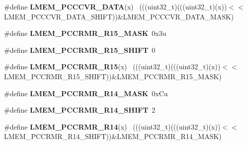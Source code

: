 \begin{DoxyCompactItemize}
\item 
\hypertarget{group___l_m_e_m___register___masks_ga3b95b7a350d6a043b441c90a8bc576f1}{}\#define {\bfseries L\+M\+E\+M\+\_\+\+P\+C\+C\+C\+V\+R\+\_\+\+D\+A\+T\+A}(x)                                        ~(((uint32\+\_\+t)(((uint32\+\_\+t)(x))$<$$<$L\+M\+E\+M\+\_\+\+P\+C\+C\+C\+V\+R\+\_\+\+D\+A\+T\+A\+\_\+\+S\+H\+I\+F\+T))\&L\+M\+E\+M\+\_\+\+P\+C\+C\+C\+V\+R\+\_\+\+D\+A\+T\+A\+\_\+\+M\+A\+S\+K)\label{group___l_m_e_m___register___masks_ga3b95b7a350d6a043b441c90a8bc576f1}

\item 
\hypertarget{group___l_m_e_m___register___masks_ga14b70993734b4be51109e03aa1fa5bfe}{}\#define {\bfseries L\+M\+E\+M\+\_\+\+P\+C\+C\+R\+M\+R\+\_\+\+R15\+\_\+\+M\+A\+S\+K}~0x3u\label{group___l_m_e_m___register___masks_ga14b70993734b4be51109e03aa1fa5bfe}

\item 
\hypertarget{group___l_m_e_m___register___masks_ga2efe89fa452d381b7dd8783936079395}{}\#define {\bfseries L\+M\+E\+M\+\_\+\+P\+C\+C\+R\+M\+R\+\_\+\+R15\+\_\+\+S\+H\+I\+F\+T}~0\label{group___l_m_e_m___register___masks_ga2efe89fa452d381b7dd8783936079395}

\item 
\hypertarget{group___l_m_e_m___register___masks_ga40511d68fe2c77abc65093b9e5037b16}{}\#define {\bfseries L\+M\+E\+M\+\_\+\+P\+C\+C\+R\+M\+R\+\_\+\+R15}(x)                                          ~(((uint32\+\_\+t)(((uint32\+\_\+t)(x))$<$$<$L\+M\+E\+M\+\_\+\+P\+C\+C\+R\+M\+R\+\_\+\+R15\+\_\+\+S\+H\+I\+F\+T))\&L\+M\+E\+M\+\_\+\+P\+C\+C\+R\+M\+R\+\_\+\+R15\+\_\+\+M\+A\+S\+K)\label{group___l_m_e_m___register___masks_ga40511d68fe2c77abc65093b9e5037b16}

\item 
\hypertarget{group___l_m_e_m___register___masks_gab9ecd999d1105864b21f9f35a186d802}{}\#define {\bfseries L\+M\+E\+M\+\_\+\+P\+C\+C\+R\+M\+R\+\_\+\+R14\+\_\+\+M\+A\+S\+K}~0x\+Cu\label{group___l_m_e_m___register___masks_gab9ecd999d1105864b21f9f35a186d802}

\item 
\hypertarget{group___l_m_e_m___register___masks_gaedbf94a5cbc142f720dba20256850ea4}{}\#define {\bfseries L\+M\+E\+M\+\_\+\+P\+C\+C\+R\+M\+R\+\_\+\+R14\+\_\+\+S\+H\+I\+F\+T}~2\label{group___l_m_e_m___register___masks_gaedbf94a5cbc142f720dba20256850ea4}

\item 
\hypertarget{group___l_m_e_m___register___masks_gab0ba92199205e8ab20ea924b66319b8c}{}\#define {\bfseries L\+M\+E\+M\+\_\+\+P\+C\+C\+R\+M\+R\+\_\+\+R14}(x)                                          ~(((uint32\+\_\+t)(((uint32\+\_\+t)(x))$<$$<$L\+M\+E\+M\+\_\+\+P\+C\+C\+R\+M\+R\+\_\+\+R14\+\_\+\+S\+H\+I\+F\+T))\&L\+M\+E\+M\+\_\+\+P\+C\+C\+R\+M\+R\+\_\+\+R14\+\_\+\+M\+A\+S\+K)\label{group___l_m_e_m___register___masks_gab0ba92199205e8ab20ea924b66319b8c}


\end{DoxyCompactItemize}
